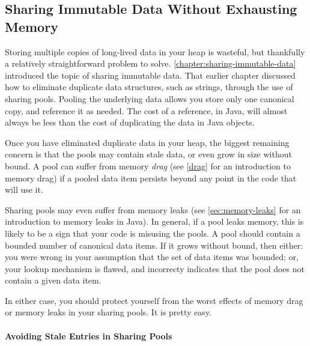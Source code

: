 \subsection{Sharing Immutable Data Without Exhausting Memory}
\label{sec:sharing-pools-safety}

Storing multiple copies of long-lived data in your heap is wasteful, but
thankfully a relatively straightforward problem to solve.
\autoref{chapter:sharing-immutable-data} introduced the topic of sharing
immutable data. That earlier chapter discussed how to eliminate duplicate data
structures, such as strings, through the use of sharing pools. Pooling the
underlying data allows you store only one canonical copy, and reference it as
needed. The cost of a reference, in Java, will almost always be less than the
cost of duplicating the data in Java objects.

Once you have eliminated duplicate data in your heap, the biggest remaining
concern is that the pools may contain stale data, or even grow in size without
bound. A pool can suffer from memory \emph{drag} (see \autoref{drag} for an
introduction to memory drag) if a pooled data item persists beyond any point in
the code that will use it.

Sharing pools may even suffer from memory leaks (see \autoref{sec:memory-leaks}
for an introduction to memory leaks in Java). In general, if a pool leaks
memory, this is likely to be a sign that your code is misusing the pools. A pool
should contain a bounded number of canonical data items. If it grows without
bound, then either: you were wrong in your assumption that the set of data items
was bounded; or, your lookup mechanism is flawed, and incorrecty indicates that
the pool does not contain a given data item.

In either case, you should protect yourself from the worst effects of memory
drag or memory leaks in your sharing pools. It is pretty easy.

\paragraph{Avoiding Stale Entries in Sharing Pools}



